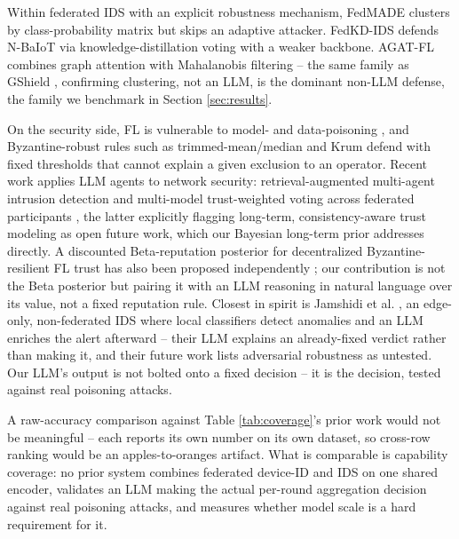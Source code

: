 \documentclass[conference]{IEEEtran}
\begin{document}
Within federated IDS with an explicit robustness mechanism, FedMADE \cite{sun2024fedmade} clusters by class-probability matrix but skips an adaptive attacker. FedKD-IDS \cite{fedkdids2025} defends N-BaIoT via knowledge-distillation voting with a weaker backbone. AGAT-FL \cite{sanjalawe2025agatfl} combines graph attention with Mahalanobis filtering -- the same family as GShield \cite{sameera2025gshield}, confirming clustering, not an LLM, is the dominant non-LLM defense, the family we benchmark in Section \ref{sec:results}.

On the security side, FL is vulnerable to model- and data-poisoning \cite{lyu2020threats,bagdasaryan2020backdoor}, and Byzantine-robust rules such as trimmed-mean/median \cite{yin2018byzantine} and Krum \cite{blanchard2017machine} defend with fixed thresholds that cannot explain a given exclusion to an operator. Recent work applies LLM agents to network security: retrieval-augmented multi-agent intrusion detection \cite{islam2026maids} and multi-model trust-weighted voting across federated participants \cite{jamshidi2026trillm}, the latter explicitly flagging long-term, consistency-aware trust modeling as open future work, which our Bayesian long-term prior addresses directly. A discounted Beta-reputation posterior for decentralized Byzantine-resilient FL trust has also been proposed independently \cite{jia2026openclaw}; our contribution is not the Beta posterior but pairing it with an LLM reasoning in natural language over its value, not a fixed reputation rule. Closest in spirit is Jamshidi et al. \cite{jamshidi2026thinkfast}, an edge-only, non-federated IDS where local classifiers detect anomalies and an LLM enriches the alert afterward -- their LLM explains an already-fixed verdict rather than making it, and their future work lists adversarial robustness as untested. Our LLM's output is not bolted onto a fixed decision -- it is the decision, tested against real poisoning attacks.

A raw-accuracy comparison against Table \ref{tab:coverage}'s prior work would not be meaningful -- each reports its own number on its own dataset, so cross-row ranking would be an apples-to-oranges artifact. What is comparable is capability coverage: no prior system combines federated device-ID and IDS on one shared encoder, validates an LLM making the actual per-round aggregation decision against real poisoning attacks, and measures whether model scale is a hard requirement for it.
\end{document}

